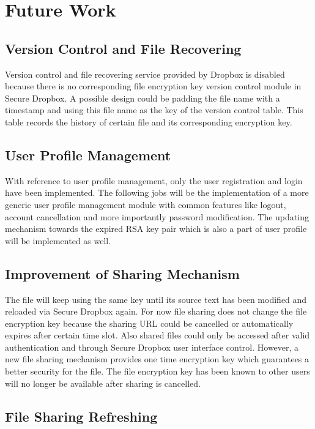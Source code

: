 \section{Future Work}

\subsection{Version Control and File Recovering}

Version control and file recovering service provided by Dropbox is disabled because there is no corresponding file encryption key version control module in Secure Dropbox. A possible design could be padding the file name with a timestamp and using this file name as the key of the version control table. This table records the history of certain file and its corresponding encryption key.

\subsection{User Profile Management}

With reference to user profile management, only the user registration and login have been implemented. The following jobs will be the implementation of a more generic user profile management module with common features like logout, account cancellation and more importantly password modification. The updating mechanism towards the expired RSA key pair which is also a part of user profile will be implemented as well.

\subsection{Improvement of Sharing Mechanism}

The file will keep using the same key until its source text has been modified and reloaded via Secure Dropbox again. For now file sharing does not change the file encryption key because the sharing URL could be cancelled or automatically expires after certain time slot. Also shared files could only be accessed after valid authentication and through Secure Dropbox user interface control. However, a new file sharing mechanism provides one time encryption key which guarantees a better security for the file. The file encryption key has been known to other users will no longer be available after sharing is cancelled.

\subsection{File Sharing Refreshing}

